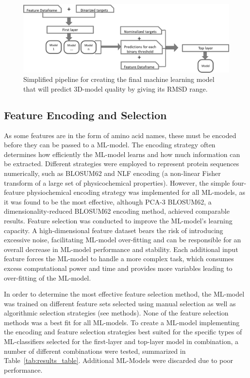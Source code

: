 \documentclass[12pt]{article}
\begin{document}
\begin{figure}
  \centering
  \includegraphics[width=\textwidth]{simple_flow.eps}
  \caption {Simplified pipeline for creating the final machine learning model that will predict 3D-model quality by giving its RMSD range.}
  \label{fig:flow}
\end{figure}

\subsection{Feature Encoding and Selection}

As some features are in the form of amino acid names, these must be
encoded before they can be passed to a ML-model. The
encoding strategy often determines how efficiently the ML-model learns
and how much information can be extracted. Different strategies were
employed to represent protein sequences numerically, such as BLOSUM62\cite{Henikoff1992} and NLF\cite{Nanni2011} encoding (a non-linear Fisher transform of a large set of physicochemical properties). However, the simple four-feature physiochemical encoding strategy\cite{Abhinandan2010} was implemented for all ML-models, as it was found to be
the most effective, although PCA-3 BLOSUM62, a dimensionality-reduced
BLOSUM62 encoding method, achieved comparable results.
Feature selection was conducted to improve the ML-model's learning
capacity. A high-dimensional feature dataset bears the risk of
introducing excessive noise, facilitating ML-model over-fitting and can be
responsible for an overall decrease in ML-model performance and
stability. Each additional input feature forces the ML-model to
handle a more complex task, which consumes excess computational power
and time and provides more variables leading to over-fitting of the ML-model.

In order to
determine the most effective feature selection method, the
ML-model was trained on different feature sets selected using manual
selection as well as algorithmic selection strategies (see methods).
None of the
feature selection methods was a best fit for all ML-models. To create a ML-model implementing the encoding and feature selection strategies best suited for the specific types of ML-classifiers selected for the first-layer and top-layer model in combination, a number of different combinations were tested, summarized in Table~\ref{tab:results_table}. Additional ML-Models were discarded due to poor performance. 
\end{document}

